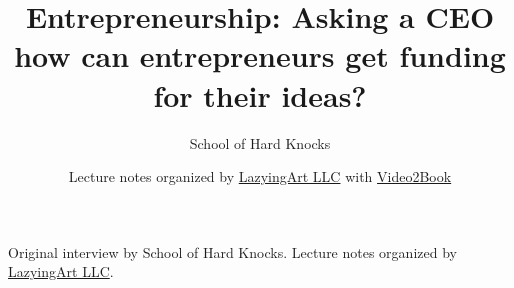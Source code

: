 \documentclass[11pt,oneside]{book}
\begin{document}
\frontmatter
\title{Entrepreneurship: Asking a CEO how can entrepreneurs get funding for their ideas?}
\author{School of Hard Knocks}
\date{Lecture notes organized by \href{https://lazying.art}{LazyingArt LLC} with \href{https://github.com/lachlanchen/Video2Book}{Video2Book}}
\maketitle
\begin{center}
\small Original interview by School of Hard Knocks. Lecture notes organized by \href{https://lazying.art}{LazyingArt LLC}.
\end{center}
\clearpage
\mainmatter

\end{document}

